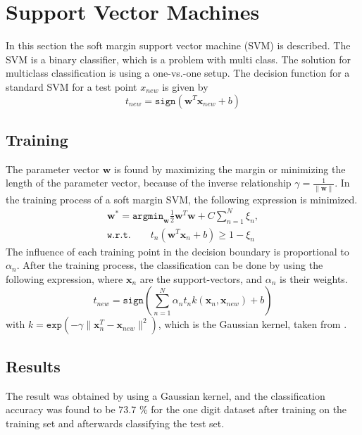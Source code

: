 \section*{Support Vector Machines}
In this section the soft margin support vector machine (SVM) is described. 
The SVM is a binary classifier, which is a problem with multi class. 
The solution for multiclass classification is using a one-vs.-one setup.
The decision function for a standard SVM for a test point $ x_{new} $ is given by
\begin{equation}
t_{new} = \mathtt{sign}(\mathbf{w}^T \mathbf{x}_{new} +b)
\label{eq:SVM_lin}
\end{equation}

\subsection*{Training}
The parameter vector $ \mathbf{w} $ is found by maximizing the margin or minimizing the length of the parameter vector, because of the inverse relationship $ \gamma = \frac{1}{\|\mathbf{w}\|} $.
In the training process of a soft margin SVM, the following expression is minimized. 
\begin{align}
\mathbf{w}^* = 
\mathtt{argmin}_\mathbf{w} \frac{1}{2} \mathbf{w}^T \mathbf{w}+C \sum_{n=1}^{N} \xi_n,\\ \mathtt{w.r.t.} \qquad t_n(\mathbf{w}^T \mathbf{x}_n + b) \geq 1-\xi_n
\end{align} 
The influence of each training point in the decision boundary is proportional to $ \alpha_n $.
After the training process, the classification can be done by using the following expression, where $ \mathbf{x}_n $  are the support-vectors, and $ \alpha_n $ is their weights.
\begin{equation}
t_{new} = 
\mathtt{sign}\left( \sum_{n=1}^{N} \alpha_n t_n k(\mathbf{x}_n,\mathbf{x}_{new}) +b  \right)
\end{equation}
with $ k = \mathtt{exp}(-\gamma \|\mathbf{x}^T_n - \mathbf{x}_{new} \|^2 ) $, which is the Gaussian kernel, taken from \cite{SVM:PDF}.

\subsection*{Results}
The result was obtained by using a Gaussian kernel, and the classification accuracy was found to be 73.7 \% for the one digit dataset after training on the training set and afterwards classifying the test set.